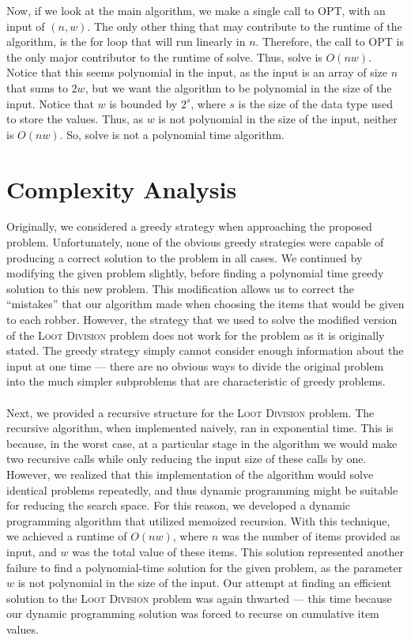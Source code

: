 \documentclass{article}
\begin{document}
Now, if we look at the main algorithm, we make a single call to OPT, with an input of $(n,w)$.  The only other thing that may contribute to the runtime of the algorithm, is the for loop that will run linearly in $n$.  Therefore, the call to OPT is the only major contributor to the runtime of solve.  Thus, solve is $O(nw)$.  Notice that this seems polynomial in the input, as the input is an array of size $n$ that sums to $2w$, but we want the algorithm to be polynomial in the size of the input.  Notice that $w$ is bounded by $2^s$, where $s$ is the size of the data type used to store the values.  Thus, as $w$ is not polynomial in the size of the input, neither is $O(nw)$.  So, solve is not a polynomial time algorithm.


\section{Complexity Analysis}

Originally, we considered a greedy strategy when approaching the proposed problem. Unfortunately, none of the obvious greedy strategies were capable of producing a correct solution to the problem in all cases. We continued by modifying the given problem slightly, before finding a polynomial time greedy solution to this new problem. This modification allows us to correct the ``mistakes'' that our algorithm made when choosing the items that would be given to each robber. However, the strategy that we used to solve the modified version of the \textsc{Loot Division} problem does not work for the problem as it is originally stated. The greedy strategy simply cannot consider enough information about the input at one time --- there are no obvious ways to divide the original problem into the much simpler subproblems that are characteristic of greedy problems. \\ \\
Next, we provided a recursive structure for the \textsc{Loot Division} problem. The recursive algorithm, when implemented naively, ran in exponential time. This is because, in the worst case, at a particular stage in the algorithm we would make two recursive calls while only reducing the input size of these calls by one. However, we realized that this implementation of the algorithm would solve identical problems repeatedly, and thus dynamic programming might be suitable for reducing the search space. For this reason, we developed a dynamic programming algorithm that utilized memoized recursion. With this technique, we achieved a runtime of $O(nw)$, where $n$ was the number of items provided as input, and $w$ was the total value of these items. This solution represented another failure to find a polynomial-time solution for the given problem, as the parameter $w$ is not polynomial in the size of the input. Our attempt at finding an efficient solution to the \textsc{Loot Division} problem was again thwarted --- this time because our dynamic programming solution was forced to recurse on cumulative item values. \\ \\
\end{document}
